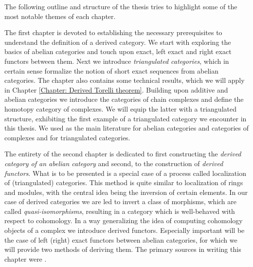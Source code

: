 

The following outline and structure of the thesis tries to highlight some of the most notable themes of each chapter.

The first chapter is devoted to establishing the necessary prerequisites to understand the definition of a derived category. We start with exploring the basics of abelian categories and touch upon exact, left exact and right exact functors between them. Next we introduce \emph{triangulated categories}, which in certain sense formalize the notion of short exact sequences from abelian categories. The chapter also contains some technical results, which we will apply in Chapter \ref{Chapter: Derived Torelli theorem}.
Building upon additive and abelian categories we introduce the categories of chain complexes and define the homotopy category of complexes. We will equip the latter with a triangulated structure, exhibiting the first example of a triangulated category we encounter in this thesis. We used \cite{kashiwara2006categories} as the main literature for abelian categories and categories of complexes and \cite{huybrechts2006fouriermukai} for triangulated categories.

The entirety of the second chapter is dedicated to first constructing the \emph{derived category of an abelian category} and second, to the construction of \emph{derived functors}. What is to be presented is a special case of a process called localization of (triangulated) categories. This method is quite similar to localization of rings and modules, with the central idea being the inversion of certain elements. In our case of derived categories we are led to invert a class of morphisms, which are called \emph{quasi-isomorphisms}, resulting in
a category which is well-behaved with respect to cohomology. In a way generalizing the idea of computing cohomology objects of a complex we introduce derived functors. Especially important will be the case of left (\resp right) exact functors between abelian categories, for which we will provide two methods of deriving them. The primary sources in writing this chapter were \cite{gelfand2002methods,milicic-dercat}.
%
%
%
%
%

